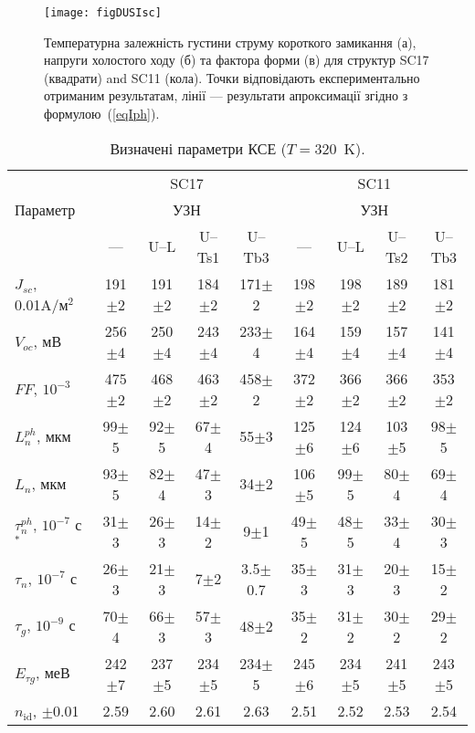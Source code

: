 \begin{figure}
\center
\texttt{[image: figDUSIsc]}%
\caption{\label{figDUSIsc}
Температурна залежність густини струму короткого замикання (а),
напруги холостого ходу (б) та
фактора форми (в)
для структур SC17 (квадрати) and SC11 (кола).
\FigCaptionSSC
Точки відповідають експериментально отриманим результатам,
лінії --- результати апроксимації згідно з формулою~(\ref{eqIph}).
}%
\end{figure}


\begin{table}
\caption{\label{tabSSCParam}Визначені параметри КСЕ ($T=320$~K).
}
\small
\begin{tabular}{|l|c|c|c|c|c|c|c|c|}
\hline
&\multicolumn{4}{c|}{SC17}&\multicolumn{4}{|c|}{SC11}\\
Параметр&\multicolumn{4}{c|}{УЗН}&\multicolumn{4}{|c|}{УЗН}\\ \cline{2-9}
&---&U--L&U--Ts1&U--Tb3&---&U--L&U--Ts2&U--Tb3\\
\hhline{|=========|}
$J_{sc}$, 0.01A/м$^2$&191$\pm$2&191$\pm$2&184$\pm$2&171$\pm$2&198$\pm$2&198$\pm$2&189$\pm$2&181$\pm$2\\ \hline
$V_{oc}$, мВ&256$\pm$4&250$\pm$4&243$\pm$4&233$\pm$4&164$\pm$4&159$\pm$4&157$\pm$4&141$\pm$4\\ \hline
$F\!F$, $10^{-3}$&475$\pm$2&468$\pm$2&463$\pm$2&458$\pm$2&372$\pm$2&366$\pm$2&366$\pm$2&353$\pm$2\\ \hline
$L_n^{ph}$, мкм&99$\pm$5&92$\pm$5&67$\pm$4&55$\pm$3&125$\pm$6&124$\pm$6&103$\pm$5&98$\pm$5\\ \hline
$L_n$, мкм&93$\pm$5&82$\pm$4&47$\pm$3&34$\pm$2&106$\pm$5&99$\pm$5&80$\pm$4&69$\pm$4\\ \hline
$\tau_n^{ph}$, $10^{-7}$ с$^*$&31$\pm$3&26$\pm$3&14$\pm$2&9$\pm$1&49$\pm$5&48$\pm$5&33$\pm$4&30$\pm$3\\ \hline
$\tau_n$, $10^{-7}$ с&26$\pm$3&21$\pm$3&7$\pm$2&3.5$\pm$0.7&35$\pm$3&31$\pm$3&20$\pm$3&15$\pm$2\\ \hline
$\tau_g$, $10^{-9}$ с&70$\pm$4&66$\pm$3&57$\pm$3&48$\pm$2&35$\pm$2&31$\pm$2&30$\pm$2&29$\pm$2\\ \hline
$E_{\tau g}$, меВ&242$\pm$7&237$\pm$5&234$\pm$5&234$\pm$5&245$\pm$6&234$\pm$5&241$\pm$5&243$\pm$5\\ \hline
$n_\mathrm{id}$, $\pm$0.01&2.59&2.60&2.61&2.63&2.51&2.52&2.53&2.54\\ \hline

\end{tabular}
\end{table}
